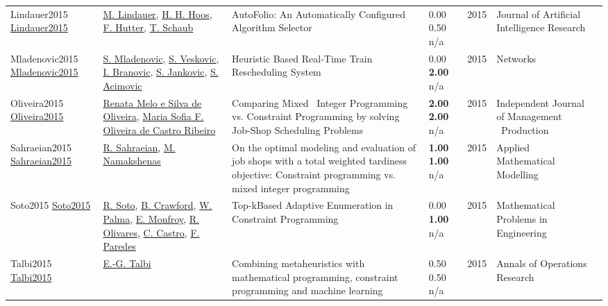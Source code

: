 {\begin{longtable}{p{3cm}p{5cm}p{10cm}p{1cm}rp{2.5cm}l}
Lindauer2015 \href{http://dx.doi.org/10.1613/jair.4726}{Lindauer2015} & \hyperref[auth:a1942]{M. Lindauer}, \hyperref[auth:a1943]{H. H. Hoos}, \hyperref[auth:a1944]{F. Hutter}, \hyperref[auth:a1945]{T. Schaub} & \cellcolor{gold!20}AutoFolio: An Automatically Configured Algorithm Selector & \noindent{}\textcolor{black!50}{0.00} 0.50 n/a & 2015 & Journal of Artificial Intelligence Research & \cite{Lindauer2015}\\
Mladenovic2015 \href{http://dx.doi.org/10.1002/net.21625}{Mladenovic2015} & \hyperref[auth:a1621]{S. Mladenovic}, \hyperref[auth:a1622]{S. Veskovic}, \hyperref[auth:a1623]{I. Branovic}, \hyperref[auth:a1624]{S. Jankovic}, \hyperref[auth:a1625]{S. Acimovic} & Heuristic Based Real‐Time Train Rescheduling System & \noindent{}\textcolor{black!50}{0.00} \textbf{2.00} n/a & 2015 & Networks & \cite{Mladenovic2015}\\
Oliveira2015 \href{http://dx.doi.org/10.14807/ijmp.v6i1.262}{Oliveira2015} & \hyperref[auth:a1568]{Renata Melo e Silva de Oliveira}, \hyperref[auth:a1569]{Maria Sofia F. Oliveira de Castro Ribeiro} & Comparing Mixed \  Integer Programming vs. Constraint Programming by solving Job-Shop Scheduling Problems & \noindent{}\textbf{2.00} \textbf{2.00} n/a & 2015 & Independent Journal of Management \  Production & \cite{Oliveira2015}\\
Sahraeian2015 \href{http://dx.doi.org/10.1016/j.apm.2014.07.032}{Sahraeian2015} & \hyperref[auth:a1863]{R. Sahraeian}, \hyperref[auth:a1864]{M. Namakshenas} & \cellcolor{gold!20}On the optimal modeling and evaluation of job shops with a total weighted tardiness objective: Constraint programming vs. mixed integer programming & \noindent{}\textbf{1.00} \textbf{1.00} n/a & 2015 & Applied Mathematical Modelling & \cite{Sahraeian2015}\\
Soto2015 \href{http://dx.doi.org/10.1155/2015/580785}{Soto2015} & \hyperref[auth:a1830]{R. Soto}, \hyperref[auth:a1831]{B. Crawford}, \hyperref[auth:a1832]{W. Palma}, \hyperref[auth:a1833]{E. Monfroy}, \hyperref[auth:a1834]{R. Olivares}, \hyperref[auth:a1835]{C. Castro}, \hyperref[auth:a1836]{F. Paredes} & \cellcolor{gold!20}Top-kBased Adaptive Enumeration in Constraint Programming & \noindent{}\textcolor{black!50}{0.00} \textbf{1.00} n/a & 2015 & Mathematical Problems in Engineering & \cite{Soto2015}\\
Talbi2015 \href{http://dx.doi.org/10.1007/s10479-015-2034-y}{Talbi2015} & \hyperref[auth:a1659]{E.-G. Talbi} & Combining metaheuristics with mathematical programming, constraint programming and machine learning & \noindent{}0.50 0.50 n/a & 2015 & Annals of Operations Research & \cite{Talbi2015}\\

\end{longtable}}
